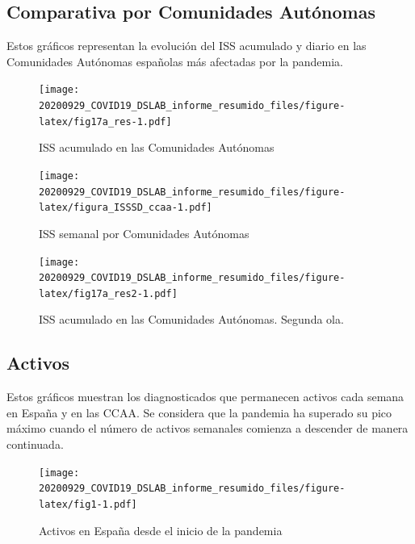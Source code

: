 \documentclass[
  11pt,
]{article}
\begin{document}
\clearpage

\hypertarget{comparativa-por-comunidades-autuxf3nomas}{%
\subsection{Comparativa por Comunidades
Autónomas}\label{comparativa-por-comunidades-autuxf3nomas}}

Estos gráficos representan la evolución del ISS acumulado y diario en
las Comunidades Autónomas españolas más afectadas por la pandemia.

\vspace{0.2cm}

\begin{figure}
\centering
\texttt{[image: 20200929\_COVID19\_DSLAB\_informe\_resumido\_files/figure-latex/fig17a\_res-1.pdf]}
\caption{\label{fig:fig17a_res} ISS acumulado en las Comunidades
Autónomas}
\end{figure}

\begin{figure}
\centering
\texttt{[image: 20200929\_COVID19\_DSLAB\_informe\_resumido\_files/figure-latex/figura\_ISSSD\_ccaa-1.pdf]}
\caption{\label{fig:figura_ISSSD_ccaa} ISS semanal por Comunidades
Autónomas}
\end{figure}

\vspace{0.2cm}

\begin{figure}
\centering
\texttt{[image: 20200929\_COVID19\_DSLAB\_informe\_resumido\_files/figure-latex/fig17a\_res2-1.pdf]}
\caption{\label{fig:fig17a_res} ISS acumulado en las Comunidades
Autónomas. Segunda ola.}
\end{figure}

\clearpage

\hypertarget{activos}{%
\subsection{Activos}\label{activos}}

Estos gráficos muestran los diagnosticados que permanecen activos cada
semana en España y en las CCAA. Se considera que la pandemia ha superado
su pico máximo cuando el número de activos semanales comienza a
descender de manera continuada.

\vspace{0.2cm}

\begin{figure}
\centering
\texttt{[image: 20200929\_COVID19\_DSLAB\_informe\_resumido\_files/figure-latex/fig1-1.pdf]}
\caption{\label{fig:fig17a_res} Activos en España desde el inicio de la
pandemia}
\end{figure}
\end{document}
